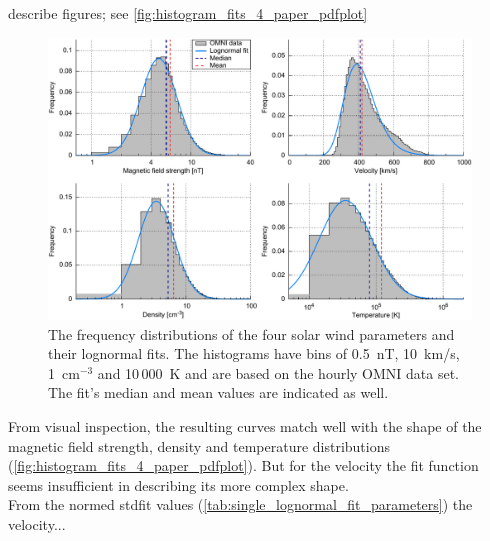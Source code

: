 describe figures; see \autoref{fig:histogram_fits_4_paper_pdfplot}
\begin{figure}[htb]
	\centering
	\includegraphics[width=1\textwidth]{images/gnuplots/histogram_fits_4_paper_pdfplot.pdf}
	\caption{The frequency distributions of the four solar wind parameters and their lognormal fits. The histograms have bins of 0.5~nT, 10~km/s, 1~cm$^{-3}$ and 10\,000~K and are based on the hourly OMNI data set. The fit's median and mean values are indicated as well.}
	\label{fig:histogram_fits_4_paper_pdfplot}
\end{figure}

From visual inspection, the resulting curves match well with the shape of the magnetic field strength, density and temperature distributions (\autoref{fig:histogram_fits_4_paper_pdfplot}). But for the velocity the fit function seems insufficient in describing its more complex shape.\\
From the normed stdfit values (\autoref{tab:single_lognormal_fit_parameters}) the velocity...\\




